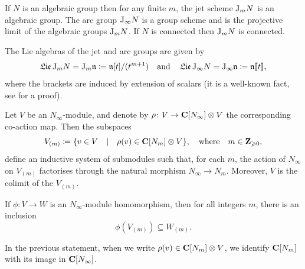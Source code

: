 \begin{example}
	If $N$ is an algebraic group then for any finite $m$, the jet scheme $\mathrm{J}_m N$ is an algebraic group. The arc group $\mathrm{J}_\infty N$ is a group scheme \cite[Remark 2.8]{ein2009jet} and is the projective limit of the algebraic groups $\mathrm{J}_m N$. If $N$ is connected then $\mathrm{J}_m N$ is connected. 
	
	The Lie algebras of the jet and arc groups are given by
	\[ \operatorname{\mathfrak{Lie}} \mathrm{J}_m N = \mathrm{J}_m \mathfrak n \coloneqq \mathfrak n[t] / (t^{m+1}) \quad \text{and} \quad \operatorname{\mathfrak{Lie}} \mathrm{J}_\infty N = \mathrm{J}_\infty \mathfrak n \coloneqq \mathfrak n[\![t]\!], \]
	where the brackets are induced by extension of scalars (it is a well-known fact, see \cite[Lemma 5.1.6.1]{juillard2025phd} for a proof).
\end{example}

\begin{proposition} \label{proposition:colimit-module-pro-group}
	Let $V$ be an $N_\infty$-module, and denote by $\rho \colon V \rightarrow \mathbf{C}[N_\infty] \otimes V$ the corresponding co-action map. Then the subspaces
	\[ V_{(m)} \coloneqq \{v \in V \quad | \quad \rho(v) \in \mathbf{C}[N_m] \otimes V \}, \quad \text{where} \quad m \in \mathbf{Z}_{\geqslant 0}, \] 
	define an inductive system of submodules such that, for each $m$, the action of $N_\infty$ on $V_{(m)}$ factorises through the natural morphism $N_\infty \rightarrow N_m$. Moreover, $V$ is the colimit of the $V_{(m)}$.
	
	If $\phi \colon V \rightarrow W$ is an $N_\infty$-module homomorphism, then for all integers $m$, there is an inclusion
	\[ \phi(V_{(m)}) \subseteq W_{(m)}. \]
\end{proposition}

\begin{remark}
	In the previous statement, when we write $\rho(v) \in \mathbf{C}[N_m] \otimes V$, we identify $\mathbf{C}[N_m]$ with its image in $\mathbf{C}[N_\infty]$.
\end{remark}

